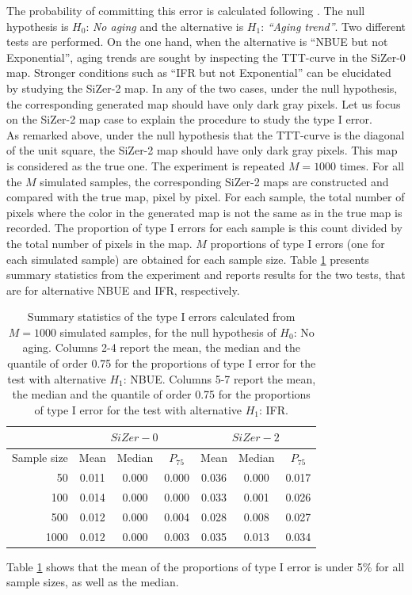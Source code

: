 \documentclass[preprint,12pt]{elsarticle}
\begin{document}
The probability of committing this error is calculated following \cite{RMP07}. The null hypothesis is $H_0$: \textit{No aging} and the  alternative is  $H_1$: \textit{``Aging trend''}. Two different tests are performed. On the one hand, when the alternative is ``NBUE but not Exponential'', aging trends are sought by inspecting the TTT-curve in the SiZer-0 map. 
Stronger conditions such as ``IFR but not Exponential'' can be elucidated by studying the SiZer-2 map. In any of the two cases, under the null hypothesis, the corresponding generated map should have only dark gray pixels.  Let us focus on the SiZer-2 map case to explain the procedure to study the type I error.\\
 
As remarked above, under the null hypothesis that the TTT-curve is the diagonal of the unit square, the SiZer-2 map  should have only dark gray pixels. This map is considered as the true one. The experiment is repeated $M=1000$ times.  For all the $M$ simulated samples, the corresponding SiZer-2 maps are constructed  and compared with the true map, pixel by pixel. For each sample,  the total number of pixels where the color in the generated map is not the same as in the true map is recorded. The proportion of type I errors for each sample is this count divided by the total number of pixels in the map.  $M$ proportions of type I errors (one for each simulated sample) are obtained for each sample size. Table \ref{Tab:errorI} presents summary statistics from the experiment and reports results for the two tests, that are for alternative NBUE and IFR, respectively. 


\begin{table}[htb]
\centering
\caption{Summary statistics of the type I errors calculated from $M=1000$ simulated samples, for the null hypothesis of $ H_0$: No aging. Columns 2-4 report the mean, the median and the quantile of order 0.75 for the proportions of type I error for the test with alternative $H_1$: NBUE.  Columns 5-7 report the mean, the median and the quantile of order 0.75 for the proportions of type I error for the test with alternative $H_1$: IFR.}
{\begin{tabular}{r|ccc|ccc}
               & \multicolumn{3}{|c|}{$SiZer-0$}& \multicolumn{3}{c|}{$SiZer-2$} \\ \hline
   Sample size & Mean &   Median & $P_{75}$ &  Mean &   Median & $P_{75}$  \\ \hline
       50      &  0.011 &0.000 &0.000 &   0.036 & 0.000 & 0.017  \\
      100      &  0.014 &0.000 &0.000 &   0.033 & 0.001 & 0.026  \\
     500       &  0.012 &0.000 &0.004 &   0.028 & 0.008 & 0.027 \\
     1000      &  0.012 &0.000 &0.003 &   0.035 & 0.013 & 0.034 \\ \hline
\end{tabular}}
\label{Tab:errorI}
\end{table}
 Table \ref{Tab:errorI}  shows that the mean of the proportions of type  I error is under 5\% for all sample sizes, as well as the median.
\end{document}
